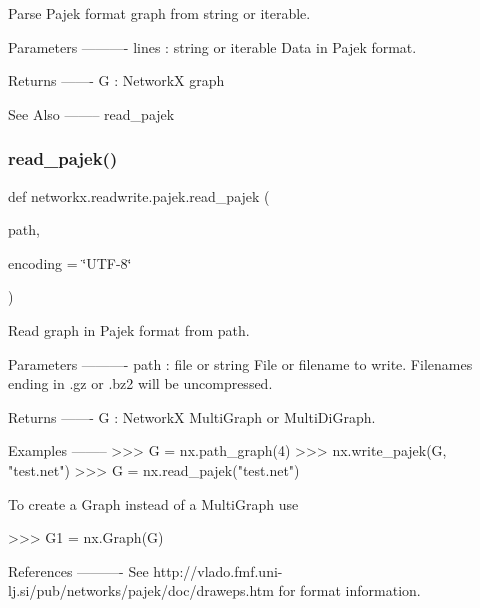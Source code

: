 \begin{DoxyVerb}Parse Pajek format graph from string or iterable.

Parameters
----------
lines : string or iterable
   Data in Pajek format.

Returns
-------
G : NetworkX graph

See Also
--------
read_pajek\end{DoxyVerb}
 \mbox{\label{namespacenetworkx_1_1readwrite_1_1pajek_ad51f4ac8ecbd12782be218e31a98380d}} 
\subsubsection{\texorpdfstring{read\+\_\+pajek()}{read\_pajek()}}
{\footnotesize\ttfamily def networkx.\+readwrite.\+pajek.\+read\+\_\+pajek (\begin{DoxyParamCaption}\item[{}]{path,  }\item[{}]{encoding = {\ttfamily \char`\"{}UTF-\/8\char`\"{}} }\end{DoxyParamCaption})}

\begin{DoxyVerb}Read graph in Pajek format from path.

Parameters
----------
path : file or string
   File or filename to write.
   Filenames ending in .gz or .bz2 will be uncompressed.

Returns
-------
G : NetworkX MultiGraph or MultiDiGraph.

Examples
--------
>>> G = nx.path_graph(4)
>>> nx.write_pajek(G, "test.net")
>>> G = nx.read_pajek("test.net")

To create a Graph instead of a MultiGraph use

>>> G1 = nx.Graph(G)

References
----------
See http://vlado.fmf.uni-lj.si/pub/networks/pajek/doc/draweps.htm
for format information.
\end{DoxyVerb}
 \mbox{\label{namespacenetworkx_1_1readwrite_1_1pajek_a280d279fd8b6591d4019046899eec5b1}} 
